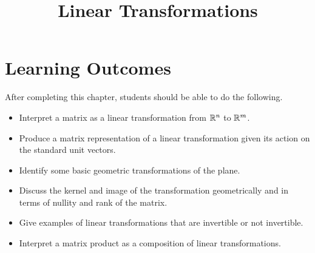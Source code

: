 \documentclass{ximera}
\title{Linear Transformations}
\begin{document}
\begin{abstract}

\end{abstract}
 
\maketitle
 
\section*{Learning Outcomes}
After completing this chapter, students should be able to do the following.
 
\begin{itemize}
    \item Interpret a matrix as a linear transformation from $\mathbb{R}^n$ to $\mathbb{R}^m$.
    \item Produce a matrix representation of a linear transformation given its action on the standard unit vectors.
    \item Identify some basic geometric transformations of the plane.
    \item Discuss the kernel and image of the transformation geometrically and in terms of nullity and rank of the matrix.
    \item Give examples of linear transformations that are invertible or not invertible.
    \item  Interpret a matrix product as a composition of linear transformations.
 
\end{itemize}

 
\end{document}

